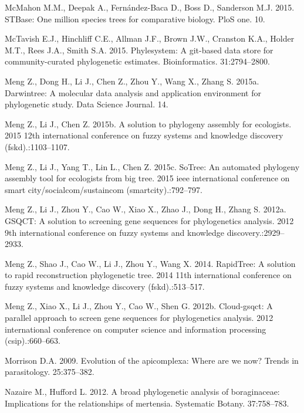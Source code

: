 \documentclass[]{article}
\begin{document}
\leavevmode\hypertarget{ref-mcmahon2015stbase}{}%
McMahon M.M., Deepak A., Fernández-Baca D., Boss D., Sanderson M.J. 2015. STBase: One million species trees for comparative biology. PloS one. 10.

\leavevmode\hypertarget{ref-mctavish2015phylesystem}{}%
McTavish E.J., Hinchliff C.E., Allman J.F., Brown J.W., Cranston K.A., Holder M.T., Rees J.A., Smith S.A. 2015. Phylesystem: A git-based data store for community-curated phylogenetic estimates. Bioinformatics. 31:2794--2800.

\leavevmode\hypertarget{ref-meng2015darwintree}{}%
Meng Z., Dong H., Li J., Chen Z., Zhou Y., Wang X., Zhang S. 2015a. Darwintree: A molecular data analysis and application environment for phylogenetic study. Data Science Journal. 14.

\leavevmode\hypertarget{ref-meng2015solution}{}%
Meng Z., Li J., Chen Z. 2015b. A solution to phylogeny assembly for ecologists. 2015 12th international conference on fuzzy systems and knowledge discovery (fskd).:1103--1107.

\leavevmode\hypertarget{ref-meng2015sotree}{}%
Meng Z., Li J., Yang T., Lin L., Chen Z. 2015c. SoTree: An automated phylogeny assembly tool for ecologists from big tree. 2015 ieee international conference on smart city/socialcom/sustaincom (smartcity).:792--797.

\leavevmode\hypertarget{ref-meng2012gsqct}{}%
Meng Z., Li J., Zhou Y., Cao W., Xiao X., Zhao J., Dong H., Zhang S. 2012a. GSQCT: A solution to screening gene sequences for phylogenetics analysis. 2012 9th international conference on fuzzy systems and knowledge discovery.:2929--2933.

\leavevmode\hypertarget{ref-meng2014rapidtree}{}%
Meng Z., Shao J., Cao W., Li J., Zhou Y., Wang X. 2014. RapidTree: A solution to rapid reconstruction phylogenetic tree. 2014 11th international conference on fuzzy systems and knowledge discovery (fskd).:513--517.

\leavevmode\hypertarget{ref-meng2012cloud}{}%
Meng Z., Xiao X., Li J., Zhou Y., Cao W., Shen G. 2012b. Cloud-gsqct: A parallel approach to screen gene sequences for phylogenetics analysis. 2012 international conference on computer science and information processing (csip).:660--663.

\leavevmode\hypertarget{ref-morrison2009apicomplexa}{}%
Morrison D.A. 2009. Evolution of the apicomplexa: Where are we now? Trends in parasitology. 25:375--382.

\leavevmode\hypertarget{ref-nazaire2012broad}{}%
Nazaire M., Hufford L. 2012. A broad phylogenetic analysis of boraginaceae: Implications for the relationships of mertensia. Systematic Botany. 37:758--783.
\end{document}
